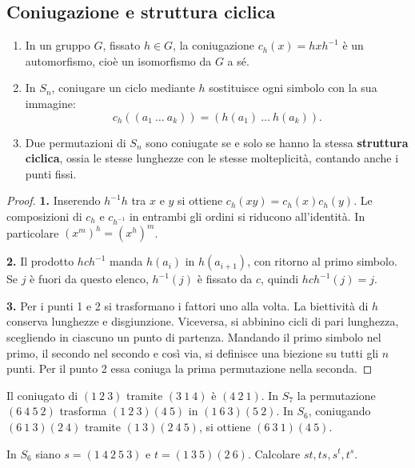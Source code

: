 \subsection{Coniugazione e struttura ciclica}
\begin{proposizione}
\begin{enumerate}
\item In un gruppo $G$, fissato $h\in G$, la coniugazione $c_h(x)=hxh^{-1}$ è un automorfismo, cioè un isomorfismo da $G$ a sé.
\item In $S_n$, coniugare un ciclo mediante $h$ sostituisce ogni simbolo con la sua immagine:
\[
 c_h((a_1\ \ldots\ a_k))=(h(a_1)\ \ldots\ h(a_k)).
\]
\item Due permutazioni di $S_n$ sono coniugate se e solo se hanno la stessa \textbf{struttura ciclica}, ossia le stesse lunghezze con le stesse molteplicità, contando anche i punti fissi.
\end{enumerate}
\end{proposizione}
\begin{proof}
\textbf{1.} Inserendo $h^{-1}h$ tra $x$ e $y$ si ottiene $c_h(xy)=c_h(x)c_h(y)$. Le composizioni di $c_h$ e $c_{h^{-1}}$ in entrambi gli ordini si riducono all'identità. In particolare $(x^m)^h=(x^h)^m$.

\textbf{2.} Il prodotto $hch^{-1}$ manda $h(a_i)$ in $h(a_{i+1})$, con ritorno al primo simbolo. Se $j$ è fuori da questo elenco, $h^{-1}(j)$ è fissato da $c$, quindi $hch^{-1}(j)=j$.

\textbf{3.} Per i punti 1 e 2 si trasformano i fattori uno alla volta. La biettività di $h$ conserva lunghezze e disgiunzione. Viceversa, si abbinino cicli di pari lunghezza, scegliendo in ciascuno un punto di partenza. Mandando il primo simbolo nel primo, il secondo nel secondo e così via, si definisce una biezione su tutti gli $n$ punti. Per il punto 2 essa coniuga la prima permutazione nella seconda.
\end{proof}
\begin{esempio}
Il coniugato di $(1\ 2\ 3)$ tramite $(3\ 1\ 4)$ è $(4\ 2\ 1)$. In $S_7$ la permutazione $(6\ 4\ 5\ 2)$ trasforma $(1\ 2\ 3)(4\ 5)$ in $(1\ 6\ 3)(5\ 2)$. In $S_6$, coniugando $(6\ 1\ 3)(2\ 4)$ tramite $(1\ 3)(2\ 4\ 5)$, si ottiene $(6\ 3\ 1)(4\ 5)$.
\end{esempio}
\begin{esercizio}
In $S_6$ siano $s=(1\ 4\ 2\ 5\ 3)$ e $t=(1\ 3\ 5)(2\ 6)$. Calcolare $st,ts,s^t,t^s$.
\end{esercizio}
